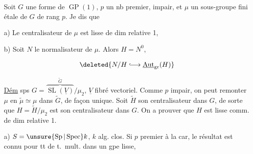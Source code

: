 Soit $G$ une forme de $\operatorname{GP}(1)$,  $p$ un nb premier, impair, et $\mu$ un sous-groupe fini étale de $G$ de rang $p$. Je dis que

a) Le centralisateur  de $\mu$ est lisse  de dim relative 1, 

b) Soit  $N$ le normalisateur de $\mu$. Alors $H=N^0$,  

\[
 \deleted{N/H\lhook\joinrel\longrightarrow\underline{\operatorname{Aut}}_{\mathrm{gr}}(H)}
\]

\uline{Dém} sps $G=\overbrace{\operatorname{SL}(\underline V)}^{\widetilde G}/\mu_2$, $\underline V$ fibré vectoriel. Comme $p$ impair, on peut remonter $\mu$ en $\widetilde\mu\simeq\mu$ dans $\widetilde G$, de façon unique. Soit $\widetilde H$ son centralisateur dans $G$, de sorte que $H=\widetilde H/\mu_2$ est son centralisateur dans $G$. On a  prouver que $H$ est lisse comm. de dim relative 1.

a) $S=\unsure{\operatorname{Sp}|\operatorname{Spec}}k$, $k$  alg. clos. Si $p$ premier à la car, le résultat  est connu pour tt  de t.\ mult. dans un gpe lisse,
